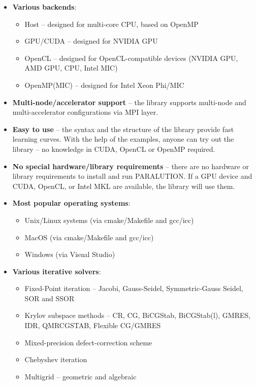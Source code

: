 \begin{itemize}

  \item {\bf Various backends}:
\begin{itemize}
  \item Host -- designed for multi-core CPU, based on OpenMP
  \item GPU/CUDA -- designed for NVIDIA GPU
  \item OpenCL -- designed for OpenCL-compatible devices (NVIDIA GPU, AMD GPU, CPU, Intel MIC)
  \item OpenMP(MIC) -- designed for Intel Xeon Phi/MIC
\end{itemize}

 \item {\bf Multi-node/accelerator support} -- the library supports multi-node and multi-accelerator configurations via MPI layer.
 
  \item {\bf Easy to use} -- the syntax and the structure of the library provide fast learning curves. With the help of the examples, anyone can try out the library -- no knowledge in CUDA, OpenCL or OpenMP required.

  \item {\bf No special hardware/library requirements} -- there are no hardware or library requirements to install and run {PARALUTION}. If a GPU device and CUDA, OpenCL, or Intel MKL are available, the library will use them.  

  \item {\bf Most popular operating systems}:
\begin{itemize}
  \item Unix/Linux systems (via cmake/Makefile and gcc/icc)
  \item MacOS (via cmake/Makefile and gcc/icc)
  \item Windows (via Visual Studio)
\end{itemize}

  \item {\bf Various iterative solvers}:
\begin{itemize}
  \item Fixed-Point iteration -- Jacobi, Gauss-Seidel, Symmetric-Gauss Seidel, SOR and SSOR
  \item Krylov subspace methods -- CR, CG, BiCGStab, BiCGStab(l), GMRES, IDR, QMRCGSTAB, Flexible CG/GMRES
  \item Mixed-precision defect-correction scheme
  \item Chebyshev iteration
  \item Multigrid -- geometric and algebraic
\end{itemize}



\end{itemize}
